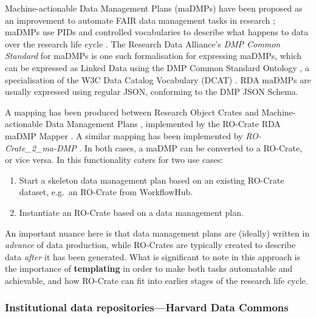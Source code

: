 Machine-actionable Data Management Plans (maDMPs) have been proposed as
an improvement to automate FAIR data management tasks in research
\cite{Miksa 2019b}; maDMPs
use PIDs and controlled vocabularies to describe what happens to data
over the research life cycle
\cite{Cardoso 2020a}. The
Research Data Alliance's \emph{DMP Common Standard} for maDMPs
\cite{Miksa 2019a} is one such
formalisation for expressing maDMPs, which can be expressed as Linked
Data using the DMP Common Standard Ontology
\cite{Cardoso 2020b}, a
specialisation of the W3C Data Catalog Vocabulary (DCAT)
\cite{Albertoni 2020}.
RDA maDMPs are usually expressed using regular JSON, conforming to the
DMP JSON Schema.

A mapping has been produced between Research Object Crates and
Machine-actionable Data Management Plans
\cite{Miksa 2020}, implemented by
the RO-Crate RDA maDMP Mapper
\cite{Arfaoui 2020}. A similar
mapping has been implemented by \emph{RO-Crate\_2\_ma-DMP}
\cite{Brenner 2020}. In both cases,
a maDMP can be converted to a RO-Crate, or vice versa. In
\cite{Miksa 2020} this
functionality caters for two use cases:

\begin{enumerate}
\item
  Start a skeleton data management plan based on an existing RO-Crate
  dataset, e.g.~an RO-Crate from WorkflowHub.
\item
  Instantiate an RO-Crate based on a data management plan.
\end{enumerate}

An important nuance here is that data management plans are (ideally)
written in \emph{advance} of data production, while RO-Crates are
typically created to describe data \emph{after} it has been generated.
What is significant to note in this approach is the importance of
\textbf{templating} in order to make both tasks automatable and
achievable, and how RO-Crate can fit into earlier stages of the research
life cycle.

\subsubsection{Institutional data repositories---Harvard Data Commons}
\label{ch5:institutionalrepos}

